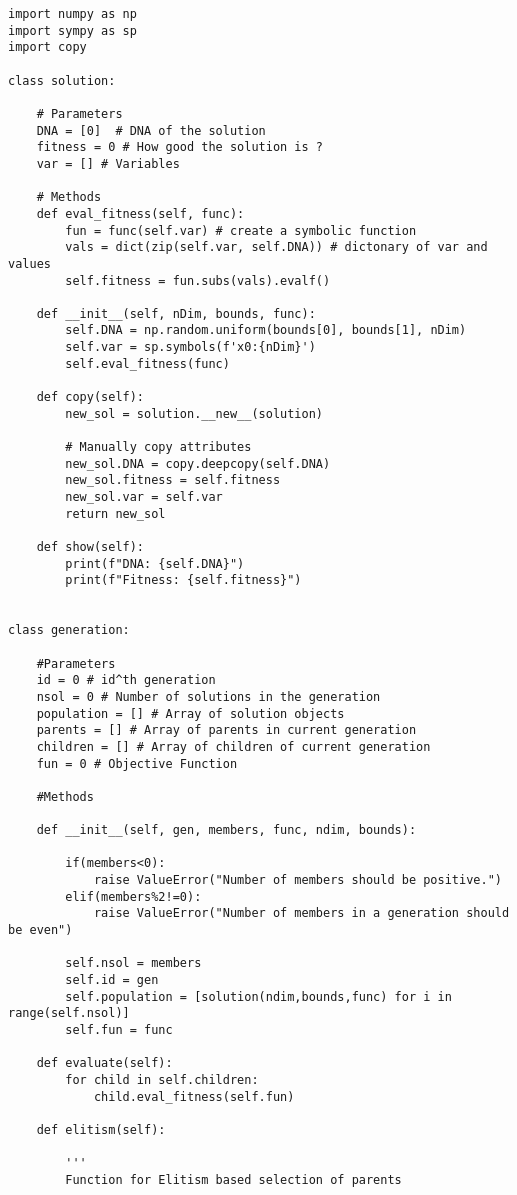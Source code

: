 \documentclass[12pt,a4paper,oneside]{paper} %
\begin{document}
\begin{verbatim}
import numpy as np
import sympy as sp
import copy

class solution:

    # Parameters
    DNA = [0]  # DNA of the solution
    fitness = 0 # How good the solution is ?
    var = [] # Variables

    # Methods
    def eval_fitness(self, func):
        fun = func(self.var) # create a symbolic function
        vals = dict(zip(self.var, self.DNA)) # dictonary of var and values
        self.fitness = fun.subs(vals).evalf()

    def __init__(self, nDim, bounds, func):
        self.DNA = np.random.uniform(bounds[0], bounds[1], nDim)
        self.var = sp.symbols(f'x0:{nDim}')
        self.eval_fitness(func)

    def copy(self):
        new_sol = solution.__new__(solution)

        # Manually copy attributes
        new_sol.DNA = copy.deepcopy(self.DNA)
        new_sol.fitness = self.fitness
        new_sol.var = self.var
        return new_sol
    
    def show(self):
        print(f"DNA: {self.DNA}")
        print(f"Fitness: {self.fitness}")


class generation:

    #Parameters
    id = 0 # id^th generation
    nsol = 0 # Number of solutions in the generation
    population = [] # Array of solution objects
    parents = [] # Array of parents in current generation
    children = [] # Array of children of current generation
    fun = 0 # Objective Function

    #Methods

    def __init__(self, gen, members, func, ndim, bounds):
        
        if(members<0):
            raise ValueError("Number of members should be positive.")
        elif(members%2!=0):
            raise ValueError("Number of members in a generation should be even")

        self.nsol = members
        self.id = gen
        self.population = [solution(ndim,bounds,func) for i in range(self.nsol)]
        self.fun = func

    def evaluate(self):
        for child in self.children:
            child.eval_fitness(self.fun)

    def elitism(self):

        '''
        Function for Elitism based selection of parents


\end{verbatim}
\end{document}
